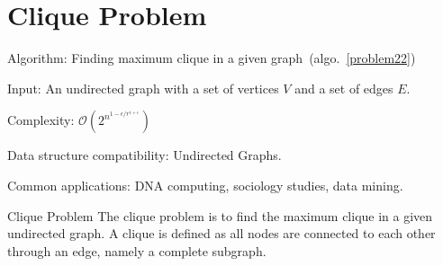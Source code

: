 \documentclass{article}
\begin{document}
\fi

%
%

\def\pbname{Clique Problem} %

\section{\pbname} 

\begin{overview}
\item [Algorithm:] Finding maximum clique in a given graph~(algo.~\ref{problem22}) 
\item [Input:] An undirected graph with a set of vertices $V$ and a set of edges $E$.
\item [Complexity:] $\mathcal{O}(2^{n^{1-\epsilon/r^{1+\epsilon}}})$
\item [Data structure compatibility:] Undirected Graphs.
\item [Common applications:] DNA computing, sociology studies, data mining.%
\end{overview}

\begin{problem}{\pbname}
	The clique problem is to find the maximum clique in a given undirected graph. A clique is defined as all nodes are connected to each other through an edge, namely a complete subgraph.
\end{problem} 
\end{document}
